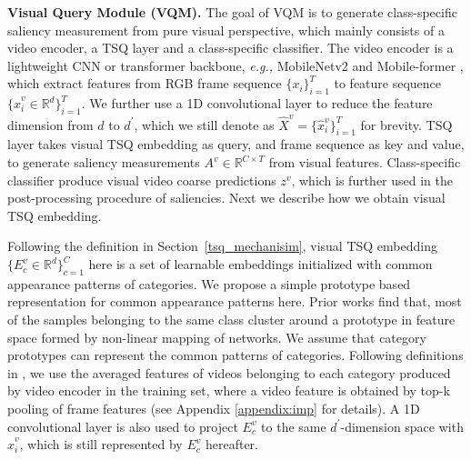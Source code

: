 \documentclass[runningheads]{llncs}
\newcommand{\secref}[1]{Section~\ref{#1}}
\begin{document}
\noindent\textbf{Visual Query Module (VQM).}
The goal of VQM is to generate class-specific saliency measurement from pure visual perspective, which mainly consists of a video encoder, a TSQ layer and a class-specific classifier. The video encoder is a lightweight CNN or transformer backbone, \emph{e.g.,} MobileNetv2 \cite{mobilenetv2} and Mobile-former \cite{mobileformer}, which extract features from RGB frame sequence $\{x_i\}_{i=1}^T$ to feature sequence $\{\hat{x}_i^v \in \mathbb{R}^d \}_{i=1}^T$. We further use a 1D convolutional layer to reduce the feature dimension from $d$ to $d^{\prime}$, which we still denote as $\hat{X}^v=\{\hat{x}_i^v\}_{i=1}^T$ for brevity. TSQ layer takes visual TSQ embedding as query, and frame sequence as key and value, to generate saliency measurements $A^v\in\mathbb{R}^{C\times T}$ from visual features. Class-specific classifier produce visual video coarse predictions $z^v$, which is further used in the post-processing procedure of saliencies. Next we describe how we obtain visual TSQ embedding.

Following the definition in \secref{tsq_mechanisim}, visual TSQ embedding $\{E_c^v \in \mathbb{R}^d \}_{c=1}^C$ here is a set of learnable embeddings initialized with common appearance patterns of categories. We propose a simple prototype based representation for common appearance patterns here. Prior works \cite{proto_network} find that, most of the samples belonging to the same class cluster around a prototype in feature space formed by non-linear mapping of networks. We assume that category prototypes can represent the common patterns of categories. Following definitions in \cite{proto_network}, we use the averaged features of videos belonging to each category produced by video encoder in the training set, where a video feature is obtained by top-k pooling of frame features (see Appendix \ref{appendix:imp} for details).
A 1D convolutional layer is also used to project $E_c^v$ to the same $d^{\prime}$-dimension space with $\hat{x}_i^v$, which is still represented by $E_c^v$ hereafter.
\end{document}
